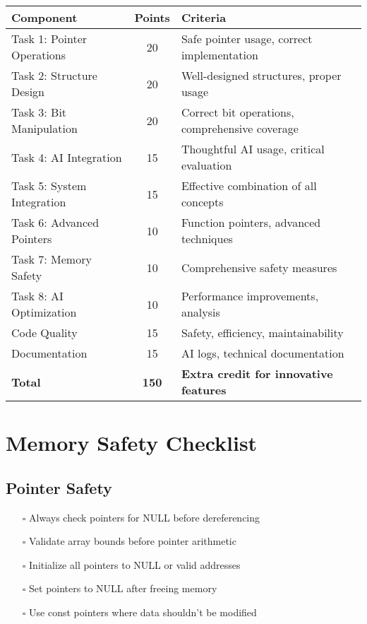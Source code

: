 \documentclass[11pt,a4paper]{article}
\begin{document}
\begin{center}
\begin{tabular}{|l|c|l|}
\hline
\textbf{Component} & \textbf{Points} & \textbf{Criteria} \\
\hline
Task 1: Pointer Operations & 20 & Safe pointer usage, correct implementation \\
Task 2: Structure Design & 20 & Well-designed structures, proper usage \\
Task 3: Bit Manipulation & 20 & Correct bit operations, comprehensive coverage \\
Task 4: AI Integration & 15 & Thoughtful AI usage, critical evaluation \\
Task 5: System Integration & 15 & Effective combination of all concepts \\
Task 6: Advanced Pointers & 10 & Function pointers, advanced techniques \\
Task 7: Memory Safety & 10 & Comprehensive safety measures \\
Task 8: AI Optimization & 10 & Performance improvements, analysis \\
Code Quality & 15 & Safety, efficiency, maintainability \\
Documentation & 15 & AI logs, technical documentation \\
\hline
\textbf{Total} & \textbf{150} & \textbf{Extra credit for innovative features} \\
\hline
\end{tabular}
\end{center}

\section{Memory Safety Checklist}

\subsection{Pointer Safety}
\begin{itemize}
    \item[$\square$] Always check pointers for NULL before dereferencing
    \item[$\square$] Validate array bounds before pointer arithmetic
    \item[$\square$] Initialize all pointers to NULL or valid addresses
    \item[$\square$] Set pointers to NULL after freeing memory
    \item[$\square$] Use const pointers where data shouldn't be modified
\end{itemize}
\end{document}
